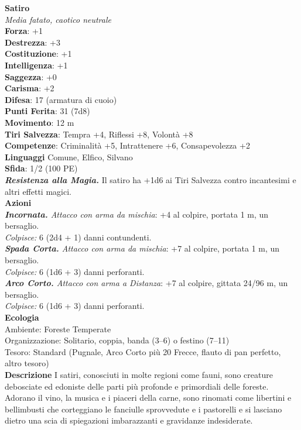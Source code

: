 \begin{multicols}{2}
\medskip\textbf{Satiro}\\
\emph{Media fatato, caotico neutrale}\\
\textbf{Forza}: +1\\
\textbf{Destrezza}: +3\\
\textbf{Costituzione}: +1\\
\textbf{Intelligenza}: +1\\
\textbf{Saggezza}: +0\\
\textbf{Carisma}: +2\\
\textbf{Difesa}: 17 (armatura di cuoio)\\
\textbf{Punti Ferita}: 31 (7d8)\\
\textbf{Movimento}: 12 m\\
\textbf{Tiri Salvezza}: Tempra +4, Riflessi +8, Volontà +8\\
\textbf{Competenze}: Criminalità +5, Intrattenere +6, Consapevolezza +2\\
\textbf{Linguaggi} Comune, Elfico, Silvano\\
\textbf{Sfida}: 1/2 (100 PE)\smallskip\\
\emph{\textbf{Resistenza alla Magia.}} Il satiro ha +1d6 ai Tiri Salvezza contro incantesimi e altri effetti magici.\\
\smallskip\textbf{Azioni}\\
\emph{\textbf{Incornata.} Attacco con arma da mischia}: +4 al colpire, portata 1 m, un bersaglio.\\
\emph{Colpisce:} 6 (2d4 + 1) danni contundenti.\\
\emph{\textbf{Spada Corta.} Attacco con arma da mischia}: +7 al colpire, portata 1 m, un bersaglio.\\
\emph{Colpisce:} 6 (1d6 + 3) danni perforanti.\\
\emph{\textbf{Arco Corto.} Attacco con arma a Distanza}: +7 al colpire, gittata 24/96 m, un bersaglio.\\
\emph{Colpisce:} 6 (1d6 + 3) danni perforanti.\\
\textbf{Ecologia}\\
Ambiente: Foreste Temperate\\
Organizzazione: Solitario, coppia, banda (3–6) o festino (7–11)\\
Tesoro: Standard (Pugnale, Arco Corto più 20 Frecce, flauto di pan perfetto, altro tesoro)\\
\textbf{Descrizione}
I satiri, conosciuti in molte regioni come fauni, sono creature debosciate ed edoniste delle parti più profonde e primordiali delle foreste. Adorano il vino, la musica e i piaceri della carne, sono rinomati come libertini e bellimbusti che corteggiano le fanciulle sprovvedute e i pastorelli e si lasciano dietro una scia di spiegazioni imbarazzanti e gravidanze indesiderate.\\


\end{multicols}
